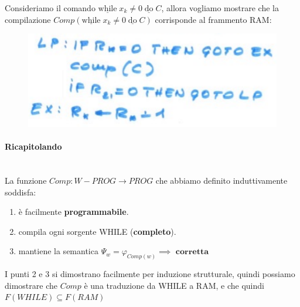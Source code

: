 \documentclass{article}
\begin{document}
\begin{itemize}
          Consideriamo il comando $\underline{\text{while}}\;x_k\neq 0\;\underline{\text{do}}\; C$,
          allora vogliamo mostrare che la compilazione $Comp(\underline{\text{while}}\;x_k\neq 0\;\underline{\text{do}}\; C)$
          corrisponde al frammento RAM:
          \begin{figure}[H]
              \centering
              \includegraphics[scale=0.5]{images/comandowhile_ram.png}
          \end{figure}

          \paragraph{Ricapitolando}\mbox{}\\
          La funzione $Comp:W-PROG\rightarrow PROG$ che abbiamo definito induttivamente soddisfa:
          \begin{enumerate}
              \item è facilmente \textbf{programmabile}.
              \item compila ogni sorgente WHILE (\textbf{completo}).
              \item mantiene la semantica $\Psi_w=\varphi_{Comp(w)}\implies\textbf{ corretta}$
          \end{enumerate}
          I punti 2 e 3 si dimostrano facilmente per induzione strutturale, quindi possiamo dimostrare
          che $Comp$ è una traduzione da WHILE a RAM, e che quindi $F(WHILE)\subseteq F(RAM)$

\end{itemize}
\end{document}
